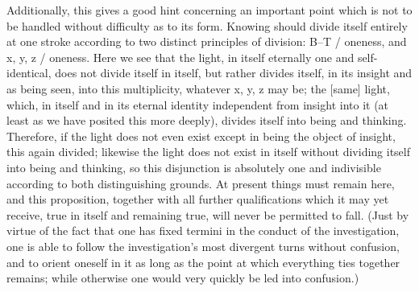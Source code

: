 Additionally, this gives a good hint
concerning an important point
which is not to be handled
without difficulty as to its form.
Knowing should divide itself entirely at one stroke
according to two distinct principles of division:
B–T / oneness, and x, y, z / oneness.
Here we see that the light,
in itself eternally one and self-identical,
does not divide itself in itself,
but rather divides itself,
in its insight and as being seen,
into this multiplicity, whatever x, y, z may be;
the [same] light, which, in itself and in its eternal
identity independent from insight into it
(at least as we have posited this more deeply),
divides itself into being and thinking.
Therefore, if the light does not even exist
except in being the object of insight,
this again divided;
likewise the light does not exist in itself
without dividing itself into being and thinking,
so this disjunction is absolutely one and indivisible
according to both distinguishing grounds.
At present things must remain here,
and this proposition, together with all
further qualifications which it may yet receive,
true in itself and remaining true,
will never be permitted to fall.
(Just by virtue of the fact that
one has fixed termini in
the conduct of the investigation,
one is able to follow the investigation’s
most divergent turns without confusion,
and to orient oneself in it
as long as the point at which
everything ties together remains;
while otherwise one would very quickly
be led into confusion.)

